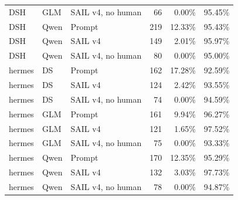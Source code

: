 \begin{table}[p]
\begin{tabular}{lllrrr}
DSH & GLM & SAIL v4, no human & 66 & 0.00\% & 95.45\% \\
DSH & Qwen & Prompt & 219 & 12.33\% & 95.43\% \\
DSH & Qwen & SAIL v4 & 149 & 2.01\% & 95.97\% \\
DSH & Qwen & SAIL v4, no human & 80 & 0.00\% & 95.00\% \\
hermes & DS & Prompt & 162 & 17.28\% & 92.59\% \\
hermes & DS & SAIL v4 & 124 & 2.42\% & 93.55\% \\
hermes & DS & SAIL v4, no human & 74 & 0.00\% & 94.59\% \\
hermes & GLM & Prompt & 161 & 9.94\% & 96.27\% \\
hermes & GLM & SAIL v4 & 121 & 1.65\% & 97.52\% \\
hermes & GLM & SAIL v4, no human & 75 & 0.00\% & 93.33\% \\
hermes & Qwen & Prompt & 170 & 12.35\% & 95.29\% \\
hermes & Qwen & SAIL v4 & 132 & 3.03\% & 97.73\% \\
hermes & Qwen & SAIL v4, no human & 78 & 0.00\% & 94.87\% \\
\bottomrule
\end{tabular}
\end{table}
